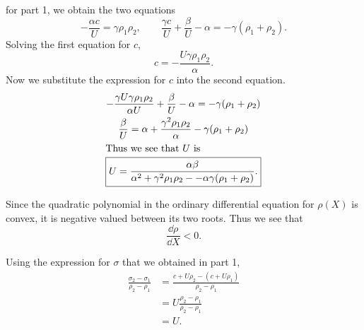 \begin{Solution}
\begin{enumerate}
    for part 1, we obtain the two equations
    \[ - \frac{\alpha c}{U} = \gamma \rho_1\rho_2, \qquad
    \frac{\gamma c}{U} + \frac{\beta}{U} -\alpha 
    = - \gamma(\rho_1+\rho_2).\]
    Solving the first equation for $c$,
    \[ c = - \frac{U \gamma \rho_1 \rho_2}{\alpha}. \]
    Now we substitute the expression for $c$ into the second equation.
    \begin{gather*}
      -\frac{\gamma U \gamma \rho_1 \rho_2}{\alpha U} + \frac{\beta}{U} -\alpha
      = - \gamma(\rho_1+\rho_2) \\
      \frac{\beta}{U} = \alpha + \frac{\gamma^2 \rho_1 \rho_2}{\alpha}
      - \gamma(\rho_1 + \rho_2) \\
      \intertext{Thus we see that $U$ is}
      \boxed{ U = \frac{\alpha \beta}{\alpha^2 + \gamma^2 \rho_1 \rho_2 - 
          - \alpha \gamma(\rho_1+\rho_2)}. }
    \end{gather*}

    Since the quadratic polynomial in the ordinary differential equation for 
    $\rho(X)$ is convex, it is negative valued between its two roots.  Thus we
    see that
    \[ \boxed{ \frac{\dd \rho}{\dd X} < 0. } \]

    Using the expression for $\sigma$ that we obtained in part 1,
    \begin{align*}
      \frac{\sigma_2-\sigma_1}{\rho_2-\rho_1}
      &= \frac{c+U\rho_2 - (c+U\rho_1)}{\rho_2-\rho_1} \\
      &= U \frac{\rho_2-\rho_1}{\rho_2-\rho_1} \\
      &= U.
    \end{align*}





\end{enumerate}
\end{Solution}
